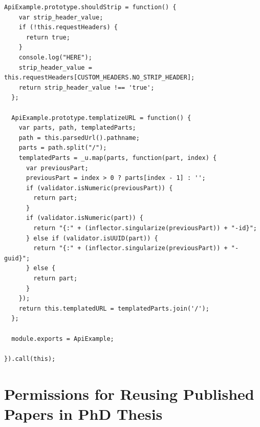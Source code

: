 \begin{lstlisting}[caption=lib/api\_example.js]
  ApiExample.prototype.shouldStrip = function() {
    var strip_header_value;
    if (!this.requestHeaders) {
      return true;
    }
    console.log("HERE");
    strip_header_value = this.requestHeaders[CUSTOM_HEADERS.NO_STRIP_HEADER];
    return strip_header_value !== 'true';
  };

  ApiExample.prototype.templatizeURL = function() {
    var parts, path, templatedParts;
    path = this.parsedUrl().pathname;
    parts = path.split("/");
    templatedParts = _u.map(parts, function(part, index) {
      var previousPart;
      previousPart = index > 0 ? parts[index - 1] : '';
      if (validator.isNumeric(previousPart)) {
        return part;
      }
      if (validator.isNumeric(part)) {
        return "{:" + (inflector.singularize(previousPart)) + "-id}";
      } else if (validator.isUUID(part)) {
        return "{:" + (inflector.singularize(previousPart)) + "-guid}";
      } else {
        return part;
      }
    });
    return this.templatedURL = templatedParts.join('/');
  };

  module.exports = ApiExample;

}).call(this);
\end{lstlisting}


\chapter{Permissions for Reusing Published Papers in PhD Thesis}

